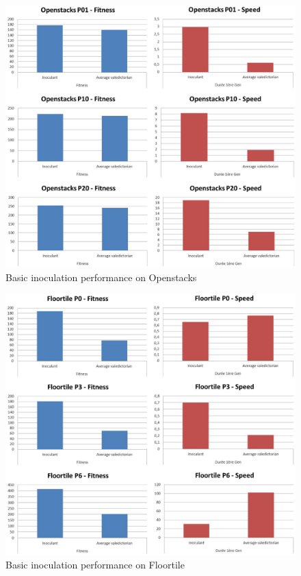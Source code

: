 \documentclass[english]{DESCARWINreport}
\begin{document}
\begin{figure}
	\centering
		\includegraphics[width=\textwidth]{pics/Openstacks.eps}
	\caption{Basic inoculation performance on Openstacks}
	\label{fig:adam_open}
\end{figure}


\begin{figure}
	\centering
		\includegraphics[width=\textwidth]{pics/Floortile.eps}
	\caption{Basic inoculation performance on Floortile}
	\label{fig:adam_floor}
\end{figure}
\end{document}
